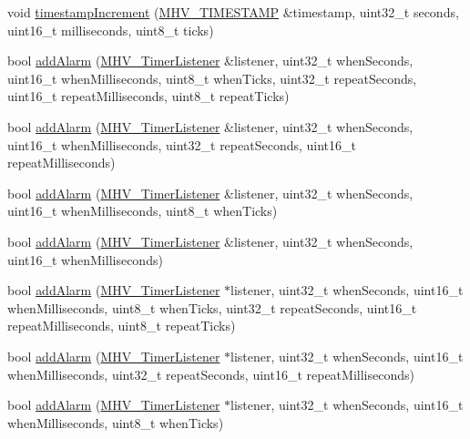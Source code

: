 \begin{DoxyCompactItemize}
\item 
void \hyperlink{class_m_h_v___r_t_c_a286a1504182064b5f8168669ac5f46c1}{timestamp\-Increment} (\hyperlink{_m_h_v___r_t_c_8h_a1e30d3a92b1b868286bd0d619245d8a6}{\-M\-H\-V\-\_\-\-T\-I\-M\-E\-S\-T\-A\-M\-P} \&timestamp, uint32\-\_\-t seconds, uint16\-\_\-t milliseconds, uint8\-\_\-t ticks)
\item 
bool \hyperlink{class_m_h_v___r_t_c_a282b2b154eebe88db8f5f1225246c326}{add\-Alarm} (\hyperlink{class_m_h_v___timer_listener}{\-M\-H\-V\-\_\-\-Timer\-Listener} \&listener, uint32\-\_\-t when\-Seconds, uint16\-\_\-t when\-Milliseconds, uint8\-\_\-t when\-Ticks, uint32\-\_\-t repeat\-Seconds, uint16\-\_\-t repeat\-Milliseconds, uint8\-\_\-t repeat\-Ticks)
\item 
bool \hyperlink{class_m_h_v___r_t_c_a97f7ec7def5d867c1d193146100e203c}{add\-Alarm} (\hyperlink{class_m_h_v___timer_listener}{\-M\-H\-V\-\_\-\-Timer\-Listener} \&listener, uint32\-\_\-t when\-Seconds, uint16\-\_\-t when\-Milliseconds, uint32\-\_\-t repeat\-Seconds, uint16\-\_\-t repeat\-Milliseconds)
\item 
bool \hyperlink{class_m_h_v___r_t_c_a041fd4bd05c84350eedb8f60d9c8efdd}{add\-Alarm} (\hyperlink{class_m_h_v___timer_listener}{\-M\-H\-V\-\_\-\-Timer\-Listener} \&listener, uint32\-\_\-t when\-Seconds, uint16\-\_\-t when\-Milliseconds, uint8\-\_\-t when\-Ticks)
\item 
bool \hyperlink{class_m_h_v___r_t_c_a112fea9b79614666f60ee1c6930a8da6}{add\-Alarm} (\hyperlink{class_m_h_v___timer_listener}{\-M\-H\-V\-\_\-\-Timer\-Listener} \&listener, uint32\-\_\-t when\-Seconds, uint16\-\_\-t when\-Milliseconds)
\item 
bool \hyperlink{class_m_h_v___r_t_c_a8d39f027b7305abd0a12aea616d8577f}{add\-Alarm} (\hyperlink{class_m_h_v___timer_listener}{\-M\-H\-V\-\_\-\-Timer\-Listener} $\ast$listener, uint32\-\_\-t when\-Seconds, uint16\-\_\-t when\-Milliseconds, uint8\-\_\-t when\-Ticks, uint32\-\_\-t repeat\-Seconds, uint16\-\_\-t repeat\-Milliseconds, uint8\-\_\-t repeat\-Ticks)
\item 
bool \hyperlink{class_m_h_v___r_t_c_a3c2af7eb56925a7c9506e2bb1f0ed965}{add\-Alarm} (\hyperlink{class_m_h_v___timer_listener}{\-M\-H\-V\-\_\-\-Timer\-Listener} $\ast$listener, uint32\-\_\-t when\-Seconds, uint16\-\_\-t when\-Milliseconds, uint32\-\_\-t repeat\-Seconds, uint16\-\_\-t repeat\-Milliseconds)
\item 
bool \hyperlink{class_m_h_v___r_t_c_a75077124ea1071f263cd06e1b35b1c5c}{add\-Alarm} (\hyperlink{class_m_h_v___timer_listener}{\-M\-H\-V\-\_\-\-Timer\-Listener} $\ast$listener, uint32\-\_\-t when\-Seconds, uint16\-\_\-t when\-Milliseconds, uint8\-\_\-t when\-Ticks)

\end{DoxyCompactItemize}
